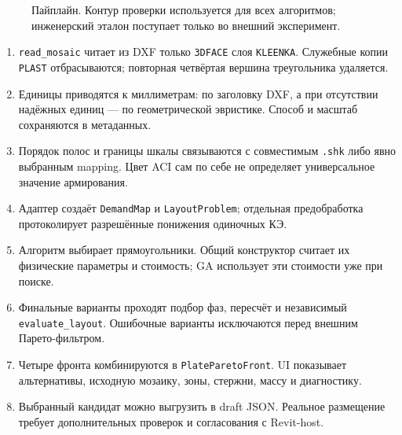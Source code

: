 \documentclass[11pt,a4paper]{article}
\begin{document}
\begin{figure}[H]
\caption{Пайплайн. Контур проверки используется для всех алгоритмов; инженерский эталон поступает только во внешний эксперимент.}\label{fig:01_pipeline}
\end{figure}

\begin{enumerate}
\item {\small\nolinkurl{read_mosaic}} читает из DXF только {\small\nolinkurl{3DFACE}} слоя {\small\nolinkurl{KLEENKA}}. Служебные копии {\small\nolinkurl{PLAST}} отбрасываются; повторная четвёртая вершина треугольника удаляется.
\item Единицы приводятся к миллиметрам: по заголовку DXF, а при отсутствии надёжных единиц — по геометрической эвристике. Способ и масштаб сохраняются в метаданных.
\item Порядок полос и границы шкалы связываются с совместимым {\small\nolinkurl{.shk}} либо явно выбранным mapping. Цвет ACI сам по себе не определяет универсальное значение армирования.
\item Адаптер создаёт {\small\nolinkurl{DemandMap}} и {\small\nolinkurl{LayoutProblem}}; отдельная предобработка протоколирует разрешённые понижения одиночных КЭ.
\item Алгоритм выбирает прямоугольники. Общий конструктор считает их физические параметры и стоимость; GA использует эти стоимости уже при поиске.
\item Финальные варианты проходят подбор фаз, пересчёт и независимый {\small\nolinkurl{evaluate_layout}}. Ошибочные варианты исключаются перед внешним Парето-фильтром.
\item Четыре фронта комбинируются в {\small\nolinkurl{PlateParetoFront}}. UI показывает альтернативы, исходную мозаику, зоны, стержни, массу и диагностику.
\item Выбранный кандидат можно выгрузить в draft JSON. Реальное размещение требует дополнительных проверок и согласования с Revit-host.
\end{enumerate}
\end{document}
